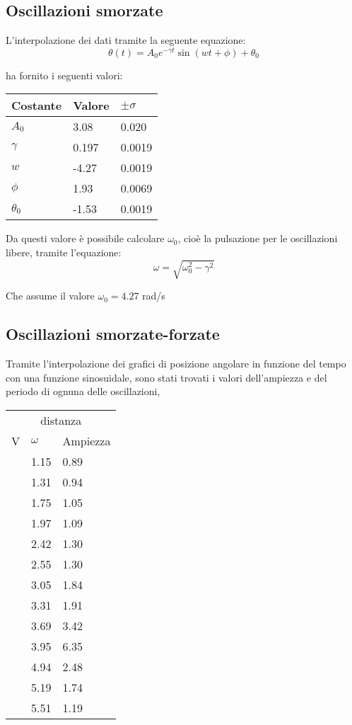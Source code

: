 \documentclass[a4paper,10pt]{report}
\begin{document}
\subsection{Oscillazioni smorzate}

L'interpolazione dei dati tramite la seguente equazione:
$$ \theta (t) = A_0 e^{- \gamma t} \sin(wt+\phi)+\theta_0 $$

ha fornito i seguenti valori:

\begin{tabular}{l|l|l}
\midrule
Costante & Valore & $ \pm \sigma$ \\
\midrule
$A_0$ & 3.08 & 0.020\\
$\gamma$ & 0.197 & 0.0019\\
$w$ & -4.27 & 0.0019\\
$\phi$ & 1.93 & 0.0069 \\
$\theta_0$ & -1.53 & 0.0019 \\
\midrule
\end{tabular}


Da questi valore è possibile calcolare $ \omega_0 $, cioè la pulsazione per le oscillazioni libere, tramite l'equazione:
$$ \omega = \sqrt{\omega_0^2 - \gamma^2} $$

Che assume il valore $\omega_0 =  4.27  $ rad/s

\subsection{Oscillazioni smorzate-forzate}

Tramite l'interpolazione dei grafici di posizione angolare in funzione del tempo con una funzione sinosuidale, sono stati trovati i valori dell'ampiezza e del periodo di ognuna delle oscillazioni,

\begin{tabular}{l|l|l}
\multicolumn{3}{c}{distanza}\\
V& $\omega$ & Ampiezza \\
\midrule
& 1.15	& 0.89\\
& 1.31	& 0.94\\
& 1.75	& 1.05\\
& 1.97	& 1.09\\
& 2.42	 & 1.30\\
& 2.55	& 1.30\\
& 3.05 &	1.84\\
& 3.31	& 1.91\\
& 3.69	& 3.42\\
& 3.95	& 6.35\\
& 4.94	& 2.48\\
& 5.19	 & 1.74\\
& 5.51	& 1.19 \\
\midrule

\end{tabular}
\end{document}
